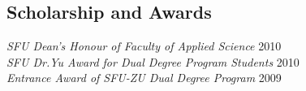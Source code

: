 \documentclass[line,margin]{res}
\begin{document}
\begin{resume}
\section {Scholarship and Awards}
    {\sl SFU Dean's Honour of Faculty of Applied Science} \hfill 2010 \\
	{\sl SFU Dr.Yu Award for Dual Degree Program Students} \hfill 2010 \\
	{\sl Entrance Award of SFU-ZU Dual Degree Program} \hfill 2009
	
\end{resume}
\end{document}
